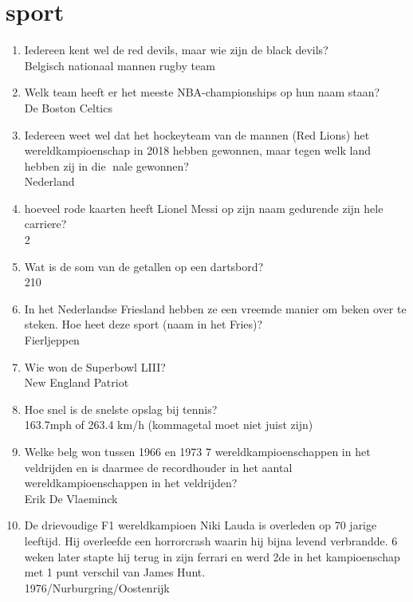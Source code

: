 \section{sport}
\begin{enumerate}
\item{Iedereen kent wel de red devils, maar wie zijn de black devils?\\ Belgisch nationaal mannen rugby team}
\item{Welk team heeft er het meeste NBA-championships op hun naam staan?\\ De Boston Celtics}
\item{Iedereen weet wel dat het hockeyteam van de mannen (Red Lions) het wereldkampioenschap in 2018 hebben gewonnen, maar tegen welk land hebben zij in die nale gewonnen?\\ Nederland}
\item{hoeveel rode kaarten heeft Lionel Messi op zijn naam gedurende zijn hele carriere?\\ 2}
\item{Wat is de som van de getallen op een dartsbord?\\ 210}
\item{In het Nederlandse Friesland hebben ze een vreemde manier om beken over te steken. Hoe heet deze sport (naam in het Fries)?\\ Fierljeppen}
\item{Wie won de Superbowl LIII?\\ New England Patriot}
\item{Hoe snel is de snelste opslag bij tennis?\\ 163.7mph of 263.4 km/h (kommagetal moet niet juist zijn)}
\item{Welke belg won tussen 1966 en 1973 7 wereldkampioenschappen in het veldrijden en is daarmee de recordhouder in het aantal wereldkampioenschappen in het veldrijden? \\ Erik De Vlaeminck}
\item{De drievoudige F1 wereldkampioen Niki Lauda is overleden op 70 jarige leeftijd. Hij overleefde een horrorcrash waarin hij bijna levend verbrandde. 6 weken later stapte hij terug in zijn ferrari en werd 2de in het kampioenschap met 1 punt verschil van James Hunt. \\ 1976/Nurburgring/Oostenrijk}
\end{enumerate}

